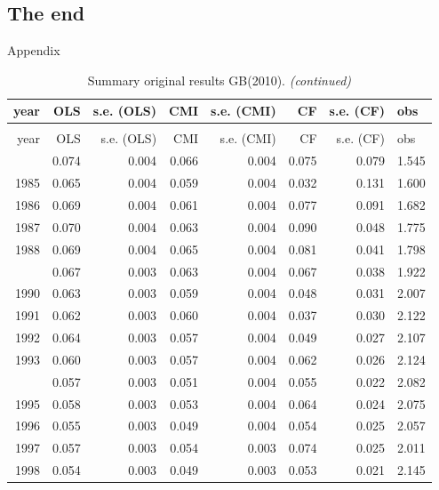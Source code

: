 \documentclass[10pt,ignorenonframetext,]{beamer}
\begin{document}
\hypertarget{the-end}{%
\subsection{The end}\label{the-end}}

\begin{frame}[allowframebreaks]{Appendix}
\protect\hypertarget{appendix}{}

\begingroup\fontsize{7}{9}\selectfont

\begin{longtable}[t]{rrrrrrrl}
\caption{\label{tab:unnamed-chunk-3}Summary original results GB(2010).}\\
\toprule
year & OLS & s.e. (OLS) & CMI & s.e. (CMI) & CF & s.e. (CF) & obs\\
\midrule
\endfirsthead
\caption[]{Summary original results GB(2010). \textit{(continued)}}\\
\toprule
year & OLS & s.e. (OLS) & CMI & s.e. (CMI) & CF & s.e. (CF) & obs\\
\midrule
\endhead
\
\endfoot
\bottomrule
\endlastfoot
1984 & 0.074 & 0.004 & 0.066 & 0.004 & 0.075 & 0.079 & 1.545\\
1985 & 0.065 & 0.004 & 0.059 & 0.004 & 0.032 & 0.131 & 1.600\\
1986 & 0.069 & 0.004 & 0.061 & 0.004 & 0.077 & 0.091 & 1.682\\
1987 & 0.070 & 0.004 & 0.063 & 0.004 & 0.090 & 0.048 & 1.775\\
1988 & 0.069 & 0.004 & 0.065 & 0.004 & 0.081 & 0.041 & 1.798\\
\addlinespace
1989 & 0.067 & 0.003 & 0.063 & 0.004 & 0.067 & 0.038 & 1.922\\
1990 & 0.063 & 0.003 & 0.059 & 0.004 & 0.048 & 0.031 & 2.007\\
1991 & 0.062 & 0.003 & 0.060 & 0.004 & 0.037 & 0.030 & 2.122\\
1992 & 0.064 & 0.003 & 0.057 & 0.004 & 0.049 & 0.027 & 2.107\\
1993 & 0.060 & 0.003 & 0.057 & 0.004 & 0.062 & 0.026 & 2.124\\
\addlinespace
1994 & 0.057 & 0.003 & 0.051 & 0.004 & 0.055 & 0.022 & 2.082\\
1995 & 0.058 & 0.003 & 0.053 & 0.004 & 0.064 & 0.024 & 2.075\\
1996 & 0.055 & 0.003 & 0.049 & 0.004 & 0.054 & 0.025 & 2.057\\
1997 & 0.057 & 0.003 & 0.054 & 0.003 & 0.074 & 0.025 & 2.011\\
1998 & 0.054 & 0.003 & 0.049 & 0.003 & 0.053 & 0.021 & 2.145\\

\end{longtable}
\end{frame}
\end{document}

